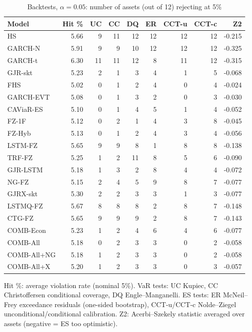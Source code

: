 \begin{table}[htbp]
\centering
\footnotesize
\caption{Backtests, $\alpha=0.05$: number of assets (out of 12) rejecting at 5\%}
\label{tab:bt_a050}
\begin{tabular}{lrrrrrrrr}
\toprule
Model & Hit \% & UC & CC & DQ & ER & CCT-u & CCT-c & Z2 \\
\midrule
HS & 5.66 & 9 & 11 & 12 & 12 & 12 & 12 & -0.215 \\
GARCH-N & 5.91 & 9 & 9 & 10 & 12 & 12 & 12 & -0.325 \\
GARCH-t & 6.30 & 11 & 11 & 12 & 8 & 11 & 12 & -0.315 \\
GJR-skt & 5.23 & 2 & 1 & 3 & 4 & 1 & 5 & -0.068 \\
FHS & 5.02 & 0 & 1 & 2 & 4 & 0 & 4 & -0.024 \\
GARCH-EVT & 5.08 & 0 & 1 & 3 & 2 & 0 & 3 & -0.030 \\
CAViaR-ES & 5.10 & 0 & 1 & 4 & 5 & 1 & 4 & -0.052 \\
FZ-1F & 5.12 & 0 & 2 & 1 & 4 & 3 & 8 & -0.045 \\
FZ-Hyb & 5.13 & 0 & 1 & 2 & 4 & 3 & 4 & -0.056 \\
LSTM-FZ & 5.65 & 9 & 9 & 8 & 1 & 8 & 8 & -0.138 \\
TRF-FZ & 5.25 & 1 & 2 & 11 & 8 & 5 & 6 & -0.090 \\
GJR-LSTM & 5.18 & 1 & 3 & 2 & 8 & 4 & 4 & -0.072 \\
NG-FZ & 5.15 & 2 & 4 & 5 & 9 & 8 & 7 & -0.077 \\
GJRX-skt & 5.30 & 2 & 2 & 3 & 3 & 1 & 3 & -0.077 \\
LSTMQ-FZ & 5.67 & 8 & 8 & 8 & 2 & 8 & 7 & -0.148 \\
CTG-FZ & 5.65 & 9 & 9 & 9 & 2 & 8 & 7 & -0.143 \\
COMB-Econ & 5.23 & 1 & 2 & 4 & 6 & 4 & 6 & -0.077 \\
COMB-All & 5.18 & 0 & 2 & 3 & 3 & 0 & 2 & -0.058 \\
COMB-All+NG & 5.18 & 1 & 2 & 3 & 3 & 0 & 2 & -0.058 \\
COMB-All+X & 5.20 & 1 & 2 & 3 & 3 & 0 & 3 & -0.057 \\
\bottomrule
\end{tabular}
\par\smallskip\parbox{\linewidth}{\scriptsize Hit \%: average violation rate (nominal 5\%). VaR tests: UC Kupiec, CC Christoffersen conditional coverage, DQ Engle--Manganelli. ES tests: ER McNeil--Frey exceedance residuals (one-sided bootstrap), CCT-u/CCT-c Nolde--Ziegel unconditional/conditional calibration. Z2: Acerbi--Szekely statistic averaged over assets (negative = ES too optimistic).}
\end{table}